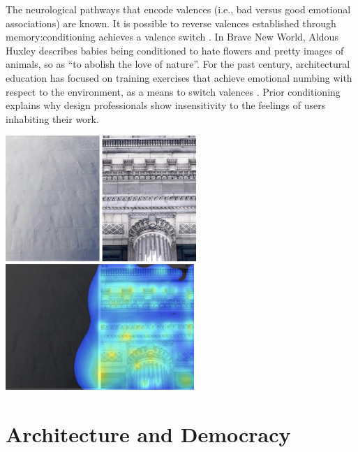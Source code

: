 \documentclass[a4paper]{article}
\begin{document}
The neurological pathways that encode valences (i.e., bad versus good emotional associations) are known. It is possible to reverse valences established through memory:conditioning achieves a valence switch \cite{redondo_bidirectional_2014}. In Brave New World, Aldous Huxley describes babies being conditioned to hate flowers and pretty images of animals, so as “to abolish the love of nature”. For the past century, architectural education has focused on training exercises that achieve emotional numbing with respect to the environment, as a means to switch valences \cite{salingaros_what_2017}. Prior conditioning explains why design professionals show insensitivity to the feelings of users inhabiting their work.

\includegraphics[height=4.75cm]{figures/beautyscale_image.png}
\includegraphics[height=4.75cm]{figures/beautyscale_heatmap.png}
\label{fig:heatmap}

\clearpage
\section{Architecture and Democracy}
\end{document}
